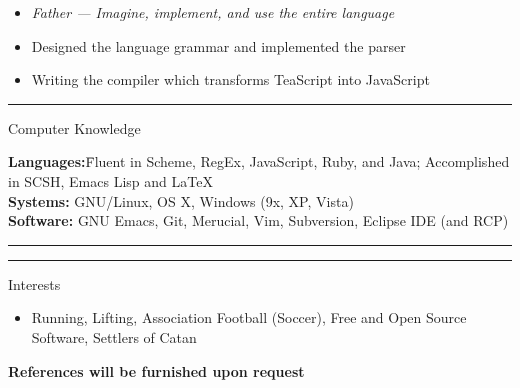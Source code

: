 \documentclass[10pt]{letter}
\begin{document}
\begin{itemize}
\setlength\itemsep{1pt}
\item [] \textit{Father --- Imagine, implement, and use the entire language }
\item Designed the language grammar and implemented the parser
\item Writing the compiler which transforms TeaScript into JavaScript
\end{itemize}

\rule{\linewidth}{.5pt}


{\Large Computer Knowledge}
\begin{tabbing}
\textbf{Languages:}\hspace{.2in}\= Fluent in Scheme, RegEx, JavaScript, Ruby,
                   and Java; Accomplished in SCSH, Emacs Lisp and \LaTeX\\
\textbf{Systems:}\> GNU/Linux, OS X, Windows (9x, XP, Vista)\\
\textbf{Software:}\> GNU Emacs, Git, Merucial, Vim, Subversion,
                     Eclipse IDE (and RCP)
\end{tabbing}\vspace{-15pt}

\rule{\linewidth}{.5pt}

\vspace{-15pt}

\rule{\linewidth}{.5pt}

{\Large Interests}\vspace{-5pt}
\begin{itemize}
\setlength\itemsep{1pt}
\item Running, Lifting, Association Football (Soccer), Free and Open Source Software, Settlers of Catan
\end{itemize}
\begin{center}\textbf{References will be furnished upon request}\end{center}
\end{document}

